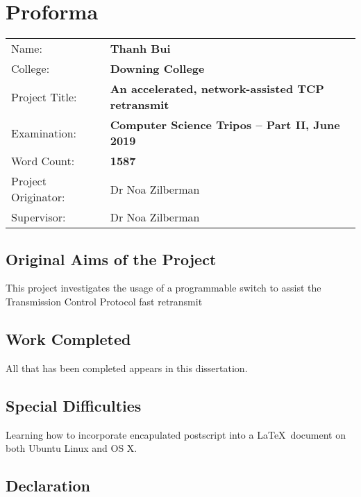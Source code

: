 \chapter*{Proforma}

{\large
\begin{tabular}{ l p{13cm}}
	Name:               & \bf Thanh Bui                      									  \\
	College:            & \bf Downing College                    							  \\
	Project Title:      & \bf An accelerated, network-assisted TCP retransmit \\
	Examination:        & \bf Computer Science Tripos -- Part II, June 2019  \\
	Word Count:         & \bf 1587\footnotemark	 \\
	Project Originator: & Dr Noa Zilberman               \\
	Supervisor:         & Dr Noa Zilberman             		\\ 
\end{tabular}
}


\section*{Original Aims of the Project}

This project investigates the usage of a programmable switch to assist the Transmission Control Protocol fast retransmit

\section*{Work Completed}

All that has been completed appears in this dissertation.

\section*{Special Difficulties}

Learning how to incorporate encapulated postscript into a \LaTeX\
document on both Ubuntu Linux and OS X.

\newpage
\section*{Declaration}

